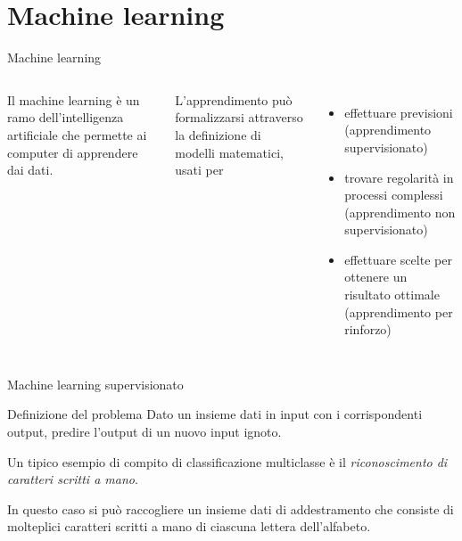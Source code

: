 \documentclass{beamer}
\begin{document}
    \section{Machine learning}

    \begin{frame}{Machine learning}
        \begin{columns}
            Il machine learning è un ramo dell'intelligenza artificiale che permette ai computer di apprendere dai dati. 

            L'apprendimento può formalizzarsi attraverso la definizione di modelli matematici, usati per
            \begin{itemize}
                \item effettuare previsioni (apprendimento supervisionato)
                \item trovare regolarità in processi complessi (apprendimento non supervisionato)
                \item effettuare scelte per ottenere un risultato ottimale (apprendimento per rinforzo)
            \end{itemize}
        \end{columns}
    \end{frame}

    \begin{frame}{Machine learning supervisionato}
        \begin{block}{Definizione del problema}
            Dato un insieme dati in input con i corrispondenti output, predire l'output di un nuovo input ignoto. 
        \end{block}
        Un tipico esempio di compito di classificazione multiclasse è il 
        \emph{riconoscimento di caratteri scritti a mano}. 
        
        In questo caso si può raccogliere un insieme dati di addestramento che 
        consiste di molteplici caratteri scritti a mano di ciascuna lettera 
        dell'alfabeto. 
    \end{frame}
\end{document}
